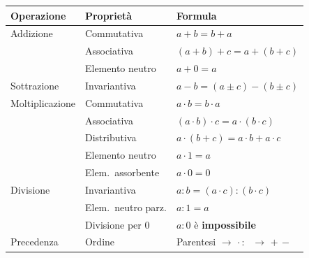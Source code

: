 \begin{center}
  \begin{tabular}{@{}llp{6cm}@{}}
    \toprule
    \textbf{Operazione} & \textbf{Proprietà}  & \textbf{Formula}                            \\
    \midrule
    Addizione           & Commutativa         & $a + b = b + a$                             \\
                        & Associativa         & $(a+b)+c = a+(b+c)$                         \\
                        & Elemento neutro     & $a + 0 = a$                                 \\
    \midrule
    Sottrazione         & Invariantiva        & $a - b = (a \pm c) - (b \pm c)$             \\
    \midrule
    Moltiplicazione     & Commutativa         & $a \cdot b = b \cdot a$                     \\
                        & Associativa         & $(a \cdot b) \cdot c = a \cdot (b \cdot c)$ \\
                        & Distributiva        & $a \cdot (b + c) = a \cdot b + a \cdot c$   \\
                        & Elemento neutro     & $a \cdot 1 = a$                             \\
                        & Elem.\ assorbente   & $a \cdot 0 = 0$                             \\
    \midrule
    Divisione           & Invariantiva        & $a : b = (a \cdot c) : (b \cdot c)$         \\
                        & Elem.\ neutro parz. & $a : 1 = a$                                 \\
                        & Divisione per 0     & $a : 0$ è \textbf{impossibile}              \\
    \midrule
    Precedenza          & Ordine              & Parentesi $\to$ $\cdot\,:\;$ $\to$ $+\,-$   \\
    \bottomrule
  \end{tabular}
\end{center}
